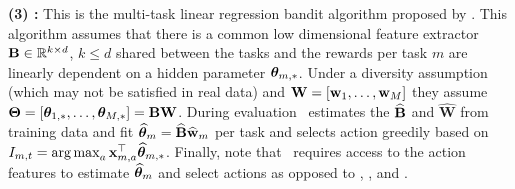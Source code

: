 \textbf{(3) \mlin:} This is the multi-task linear regression bandit algorithm proposed by \citet{yang2021impact}. This algorithm assumes that there is a common low dimensional feature extractor $\mathbf{B}\in\mathbb{R}^{k\times d}$, $k\leq d$ shared between the tasks and the rewards per task $m$ are linearly dependent on a hidden parameter $\boldsymbol{\theta}_{m,*}$. 
%
Under a diversity assumption (which may not be satisfied in real data) and $\mathbf{W}=\left[\mathbf{w}_1, \ldots, \mathbf{w}_M\right]$ they assume $\mathbf{\Theta} =\left[\boldsymbol{\theta}_{1,*}, \ldots, \boldsymbol{\theta}_{M,*}\right]=\mathbf{B} \mathbf{W}$.
%
During evaluation \mlin\ estimates the $\mathbf{\widehat{B}}$ and $\widehat{\mathbf{W}}$ from training data and fit $\widehat{\boldsymbol{\theta}}_{m}=\mathbf{\widehat{B}} \widehat{\mathbf{w}}_m$ per task and selects action greedily based on $I_{m,t} = \mathop{\rm arg\,max}_a \mathbf{x}_{m,a}^\top\widehat{\boldsymbol{\theta}}_{m,*}$. Finally, note that \mlin\ requires access to the action features to estimate $\widehat{\boldsymbol{\theta}}_{m}$ and select actions as opposed to \dpt, \ad, and \pred.




